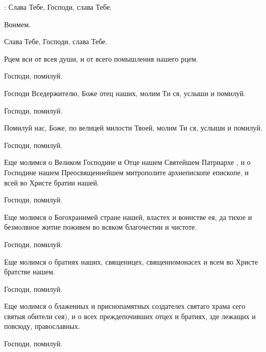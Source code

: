 \begin{mymulticols}
: Слава Тебе, Господи, слава Тебе.

 Вонмем.



 Слава Тебе, Господи, слава Тебе.



 Рцем вси от всея души, и от всего помышления нашего рцем.

 Господи, помилуй.

 Господи Вседержителю, Боже отец наших, молим Ти ся, услыши и помилуй.

 Господи, помилуй.

 Помилуй нас, Боже, по велицей милости Твоей, молим Ти ся, услыши и помилуй.

 Господи, помилуй.  

 Еще молимся о Великом Господине и Отце нашем Святейшем Патриархе , и о Господине нашем Преосвященнейшем митрополите  архиепископе епископе, и всей во Христе братии нашей. 

 Господи, помилуй.  

 Еще молимся о Богохранимей стране нашей, властех и воинстве ея, да тихое и безмолвное житие поживем во всяком благочестии и чистоте. 

 Господи, помилуй.  

 Еще молимся о братиях наших, священицех, священномонасех и всем во Христе братстве нашем.

 Господи, помилуй.  

 Еще молимся о блаженных и приснопамятных создателех святаго храма сего  святыя обители сея), и о всех преждепочивших отцех и братиях, зде лежащих и повсюду, православных. 

 Господи, помилуй.  


\end{mymulticols}
